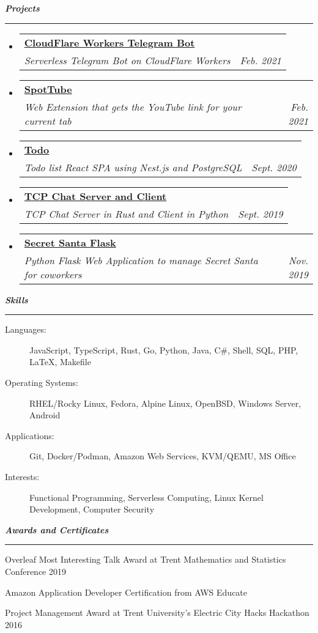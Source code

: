 \documentclass[letterpaper,11pt]{article}
\makeatletter
\newcommand{\mysection}[1]{\vspace{5pt} {\bfseries \textsl{#1}} \\ {\color{gray} \rule[5pt]{\textwidth}{1pt}}}
\newcommand{\ressubheading}[4]{\begin{tabular*}{6.7in}{l@{\extracolsep{\fill}}r}
        \textbf{#1} & #2 \\
        \textit{#3} & \textit{#4} \\
\end{tabular*}\vspace{-6pt}}
\makeatother
\begin{document}
\mysection{Projects}
\begin{itemize}
    \item
        \ressubheading{\href{https://github.com/codebam/cf-workers-telegram-bot}{CloudFlare Workers Telegram Bot}}{}{Serverless Telegram Bot on CloudFlare Workers}{Feb. 2021}
    \item
        \ressubheading{\href{https://github.com/codebam/spottube}{SpotTube}}{}{Web Extension that gets the YouTube link for your current tab}{Feb. 2021}
    \item
        \ressubheading{\href{https://github.com/codebam/todo}{Todo}}{}{Todo list React SPA using Nest.js and PostgreSQL}{Sept. 2020}
    \item
        \ressubheading{\href{https://github.com/codebam/chatserver-rust}{TCP Chat Server and Client}}{}{TCP Chat Server in Rust and Client in Python}{Sept. 2019}
    \item
        \ressubheading{\href{https://github.com/codebam/secret\_santa}{Secret Santa Flask}}{}{Python Flask Web Application to manage Secret Santa for coworkers}{Nov. 2019}
\end{itemize}

\mysection{Skills}
\begin{description}
    \item[Languages:]
        JavaScript, TypeScript, Rust, Go, Python, Java, C\#, Shell, SQL, PHP, \LaTeX{}, Makefile
    \item[Operating Systems:]
        RHEL/Rocky Linux, Fedora, Alpine Linux, OpenBSD, Windows Server, Android
    \item[Applications:]
        Git, Docker/Podman, Amazon Web Services, KVM/QEMU, MS Office
    \item[Interests:]
        Functional Programming, Serverless Computing, Linux Kernel Development, Computer Security
\end{description}

\mysection{Awards and Certificates}
\begin{description}
    \item Overleaf Most Interesting Talk Award at Trent Mathematics and Statistics Conference 2019
    \item Amazon Application Developer Certification from AWS Educate
    \item Project Management Award at Trent University's Electric City Hacks Hackathon 2016
\end{description}
\end{document}
